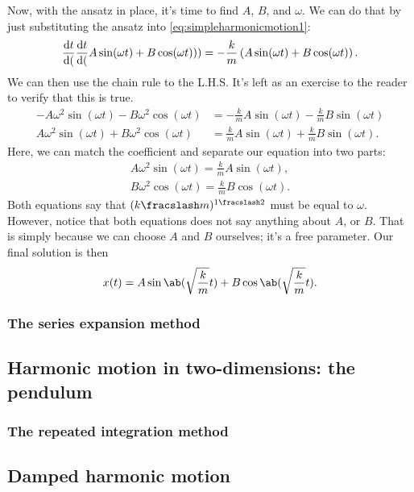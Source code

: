 Now, with the ansatz in place, it's time to find $A$, $B$, and $\omega$. We can do that by just substituting the ansatz into \cref{eq:simpleharmonicmotion1}:
\begin{equation*}
    \odv{t}(\odv{t}(A\sin(\omega t) + B\cos(\omega t))) = -\frac{k}{m}\left(A\sin(\omega t) + B\cos(\omega t)\right).
\end{equation*}
We can then use the chain rule to the L.H.S. It's left as an exercise to the reader to verify that this is true.
\begin{align*}
    -A\omega^2\sin(\omega t) -B\omega^2\cos(\omega t) &= -\frac{k}{m}A\sin(\omega t) -\frac{k}{m}B\sin(\omega t) \\
    A\omega^2\sin(\omega t) + B\omega^2\cos(\omega t) &= \frac{k}{m}A\sin(\omega t) + \frac{k}{m}B\sin(\omega t).
\end{align*}
Here, we can match the coefficient and separate our equation into two parts:
\begin{gather*}
    A\omega^2\sin(\omega t) = \frac{k}{m}A\sin(\omega t), \\
    B\omega^2\cos(\omega t) = \frac{k}{m}B\cos(\omega t).
\end{gather*}
Both equations say that $(\flatfrac{k}{m})^{\flatfrac{1}{2}}$ must be equal to $\omega$. However, notice that both equations does not say anything about $A$, or $B$. That is simply because we can choose $A$ and $B$ ourselves; it's a free parameter. Our final solution is then
\begin{equation*}
    x(t) = A\sin\ab(\sqrt{\frac{k}{m}}t) + B\cos\ab(\sqrt{\frac{k}{m}}t).
\end{equation*}

\subsubsection{The series expansion method}

\subsection{Harmonic motion in two-dimensions: the pendulum}

\subsubsection{The repeated integration method}

\subsection{Damped harmonic motion}

